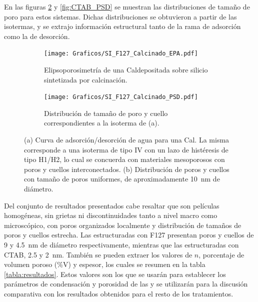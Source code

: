 		 En las figuras \ref{fig:F127_PSD} y \ref{fig:CTAB_PSD} se muestran las distribuciones de tamaño de poro para estos sistemas. Dichas distribuciones se obtuvieron a partir de las isotermas, y se extrajo información estructural tanto de la rama de adsorción como la de desorción.


		     	  	\begin{figure}[!ht]
		     	  		\begin{subfigure}[t]{0.495\textwidth}
		     	  		\texttt{[image: Graficos/SI\_F127\_Calcinado\_EPA.pdf]}
						\caption{Elipsoporosimetría de una Cal\pdmF\space depositada sobre silicio sintetizada por calcinación.}
						\label{fig:F127_EPA}
						\end{subfigure}
						\begin{subfigure}[t]{0.495\textwidth}
		     	  		\texttt{[image: Graficos/SI\_F127\_Calcinado\_PSD.pdf]}
						\caption{Distribución de tamaño de poro y cuello correspondientes a la isoterma de (a).}
						\label{fig:F127_PSD}
						\end{subfigure}
						\caption[Elipsoporosimetría para sistemas Cal\pdmF.]{(a) Curva de adsorción/desorción de agua para una Cal\pdmF. La misma corresponde a una isoterma de tipo IV con un lazo de histéresis de tipo H1/H2, lo cual se concuerda con materiales mesoporosos con poros y cuellos interconectados. (b) Distribución de poros y cuellos con tamaño de poros uniformes, de aproximadamente \SI{10}{\nm} de diámetro.}
						\label{fig:F127_epa_psd_cal}
						\end{figure}
						
		

		 	Del conjunto de resultados presentados cabe resaltar que son películas homogéneas, sin grietas ni discontinuidades tanto a nivel macro como microscópico, con poros organizados localmente y distribución de tamaños de poros y cuellos estrecha. Las \pdm\space estructuradas con F127 presentan poros y cuellos de 9 y \SI{4.5}{\nm} de diámetro respectivamente, mientras que las estructuradas con CTAB, 2.5 y \SI{2}{\nm}. También se pueden extraer los valores de $n$, porcentaje de volumen poroso (\%V) y espesor, los cuales se resumen en la tabla \ref{tabla:resultados}. Estos valores son los que se usarán para establecer los parámetros de condensación y porosidad de las \pdm\space y se utilizarán para la discusión comparativa con los resultados obtenidos para el resto de los tratamientos.

